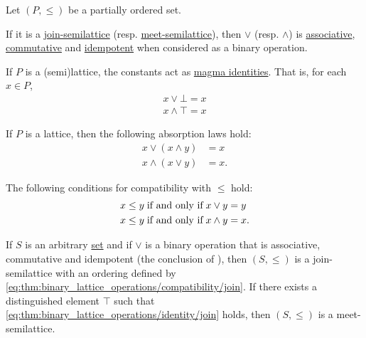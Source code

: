 \begin{proposition}\label{thm:binary_lattice_operations}
  Let \( (P, \leq) \) be a partially ordered set.

  \begin{thmenum}
     If it is a \hyperref[def:semilattice/join]{join-semilattice} (resp. \hyperref[def:semilattice/meet]{meet-semilattice}), then \( \vee \) (resp. \( \wedge \)) is \hyperref[def:magma/associative]{associative}, \hyperref[def:magma/commutative]{commutative} and \hyperref[def:magma/idempotent]{idempotent} when considered as a binary operation.

     If \( P \) is a (semi)lattice, the constants act as \hyperref[def:magma_identity]{magma identities}. That is, for each \( x \in P \),
    \begin{align}
      x \vee \bot = x \label{eq:thm:binary_lattice_operations/identity/join} \\
      x \wedge \top = x \label{eq:thm:binary_lattice_operations/identity/meet}
    \end{align}

     If \( P \) is a lattice, then the following absorption laws hold:
    \begin{align}
      x \vee (x \wedge y) &= x \label{eq:thm:binary_lattice_operations/absorption/join} \\
      x \wedge (x \vee y) &= x \label{eq:thm:binary_lattice_operations/absorption/meet}.
    \end{align}

     The following conditions for compatibility with \( \leq \) hold:
    \begin{align}
      x \leq y &\T{if and only if} x \vee y = y \label{eq:thm:binary_lattice_operations/compatibility/join} \\
      x \leq y &\T{if and only if} x \wedge y = x \label{eq:thm:binary_lattice_operations/compatibility/meet}.
    \end{align}

     If \( S \) is an arbitrary \hyperref[def:set]{set} and if \( \vee \) is a binary operation that is associative, commutative and idempotent (the conclusion of ), then \( (S, \leq) \) is a join-semilattice with an ordering defined by \eqref{eq:thm:binary_lattice_operations/compatibility/join}. If there exists a distinguished element \( \top \) such that \eqref{eq:thm:binary_lattice_operations/identity/join} holds, then \( (S, \leq) \) is a meet-semilattice.


\end{thmenum}
\end{proposition}
